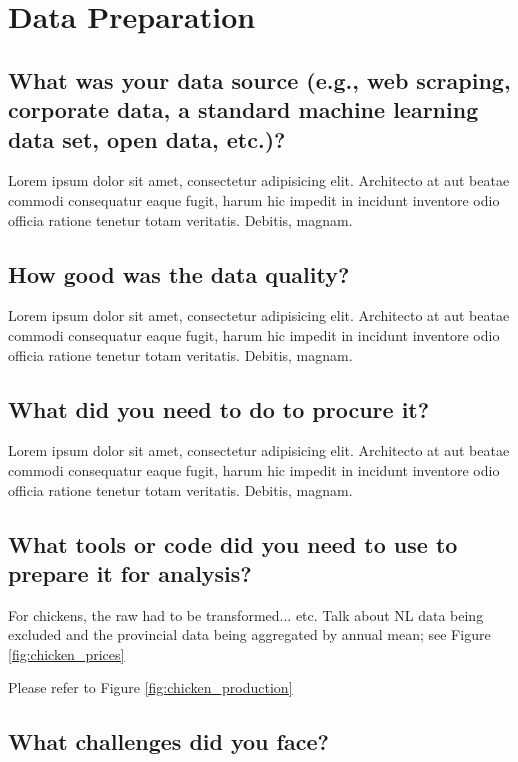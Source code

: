 \section{Data Preparation}

\subsection{What was your data source (e.g., web scraping, corporate data, a standard machine learning data set, open data, etc.)?}

Lorem ipsum dolor sit amet, consectetur adipisicing elit. Architecto at aut beatae commodi consequatur eaque fugit, harum hic impedit in incidunt inventore odio officia ratione tenetur totam veritatis. Debitis, magnam.

\subsection{How good was the data quality?}

Lorem ipsum dolor sit amet, consectetur adipisicing elit. Architecto at aut beatae commodi consequatur eaque fugit, harum hic impedit in incidunt inventore odio officia ratione tenetur totam veritatis. Debitis, magnam.

\subsection{What did you need to do to procure it?}

Lorem ipsum dolor sit amet, consectetur adipisicing elit. Architecto at aut beatae commodi consequatur eaque fugit, harum hic impedit in incidunt inventore odio officia ratione tenetur totam veritatis. Debitis, magnam.

\subsection{What tools or code did you need to use to prepare it for analysis?}

For chickens, the raw had to be transformed... etc. Talk about NL data being excluded and the provincial data being aggregated by annual mean; see Figure \ref{fig:chicken_prices}

Please refer to Figure \ref{fig:chicken_production}

\subsection{What challenges did you face?}


